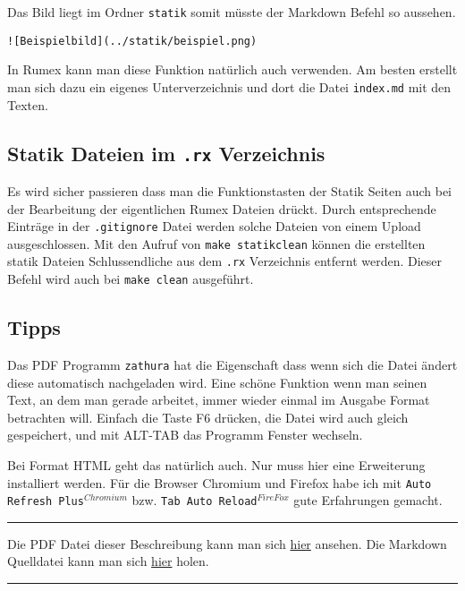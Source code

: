 Das Bild liegt im Ordner \texttt{statik} somit müsste der Markdown
Befehl so aussehen.

\begin{verbatim}
![Beispielbild](../statik/beispiel.png)
\end{verbatim}

In Rumex kann man diese Funktion natürlich auch verwenden. Am besten
erstellt man sich dazu ein eigenes Unterverzeichnis und dort die Datei
\texttt{index.md} mit den Texten.

\subsection{Statik Dateien im \texttt{.rx}
Verzeichnis}\label{statik-dateien-im-.rx-verzeichnis}

Es wird sicher passieren dass man die Funktionstasten der Statik Seiten
auch bei der Bearbeitung der eigentlichen Rumex Dateien drückt. Durch
entsprechende Einträge in der \texttt{.gitignore} Datei werden solche
Dateien von einem Upload ausgeschlossen. Mit den Aufruf von
\texttt{make statikclean} können die erstellten statik Dateien
Schlussendliche aus dem \texttt{.rx} Verzeichnis entfernt werden. Dieser
Befehl wird auch bei \texttt{make clean} ausgeführt.

\subsection{Tipps}\label{tipps-1}

Das PDF Programm \texttt{zathura} hat die Eigenschaft dass wenn sich die
Datei ändert diese automatisch nachgeladen wird. Eine schöne Funktion
wenn man seinen Text, an dem man gerade arbeitet, immer wieder einmal im
Ausgabe Format betrachten will. Einfach die Taste F6 drücken, die Datei
wird auch gleich gespeichert, und mit ALT-TAB das Programm Fenster
wechseln.

Bei Format HTML geht das natürlich auch. Nur muss hier eine Erweiterung
installiert werden. Für die Browser Chromium und Firefox habe ich mit
\texttt{Auto Refresh Plus}$^{Chromium}$ bzw.
\texttt{Tab Auto Reload}$^{FireFox}$ gute Erfahrungen gemacht.

\begin{center}\rule{3in}{0.4pt}\end{center}

Die PDF Datei dieser Beschreibung kann man sich \href{index.pdf}{hier}
ansehen. Die Markdown Quelldatei kann man sich \href{index.md}{hier}
holen.

\begin{center}\rule{3in}{0.4pt}\end{center}

